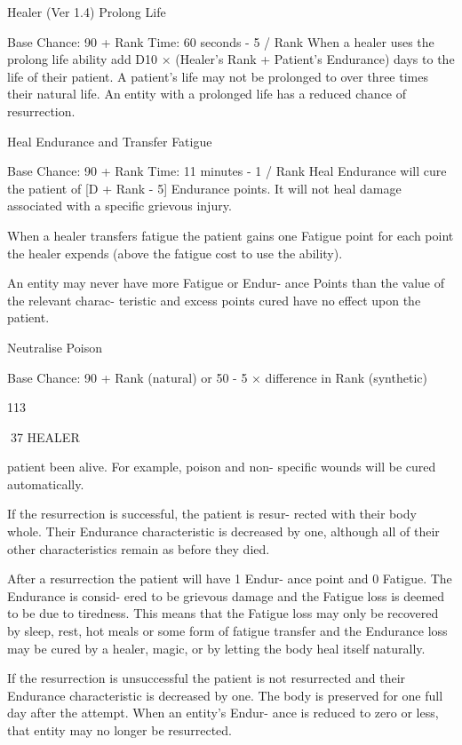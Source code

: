 \begin{Chapter}{Healer (Ver 1.4)}
Prolong Life 

Base Chance: 90 + Rank 
Time: 60 seconds - 5 / Rank 
When a healer uses the prolong life ability add D10 
×  (Healer’s  Rank  +  Patient’s  Endurance)  days  to 
the life of their patient. A patient’s life may not be 
prolonged to over three times their natural life. An 
entity  with  a  prolonged  life  has  a  reduced  chance 
of resurrection. 

Heal Endurance and Transfer Fatigue 

Base Chance: 90 + Rank 
Time: 11 minutes - 1 / Rank 
Heal Endurance will cure the patient of [D + Rank 
-  5]  Endurance  points.  It  will  not  heal  damage 
associated with a specific grievous injury. 

When  a  healer  transfers  fatigue  the  patient  gains 
one Fatigue point for each point the healer expends 
(above the fatigue cost to use the ability). 

An entity may never have more  Fatigue or Endur-
ance  Points  than  the  value  of  the  relevant  charac-
teristic and excess points cured have no effect upon 
the patient. 

Neutralise Poison 

Base  Chance:  90  +  Rank  (natural)  or  50  -  5  × 
difference in Rank (synthetic) 

113 

37 HEALER 

patient  been  alive.  For  example,  poison  and  non-
specific wounds will be cured automatically. 

If the resurrection is successful, the patient is resur-
rected  with  their  body  whole.  Their  Endurance 
characteristic  is  decreased  by  one,  although  all  of 
their  other  characteristics  remain  as  before  they 
died. 

After a resurrection the patient will have 1 Endur-
ance point and 0 Fatigue. The Endurance is consid-
ered to be grievous damage and the Fatigue loss is 
deemed to be due to tiredness. This means that the 
Fatigue  loss may  only  be  recovered  by  sleep,  rest, 
hot meals or some form of fatigue transfer and the 
Endurance loss may be cured by a healer, magic, or 
by letting the body heal itself naturally. 

If the resurrection is unsuccessful the patient is not 
resurrected  and  their  Endurance  characteristic  is 
decreased  by  one.  The  body  is  preserved  for  one 
full day after the attempt. When an entity’s Endur-
ance is  reduced  to  zero  or  less,  that entity  may  no 
longer be resurrected. 


\end{Chapter}
